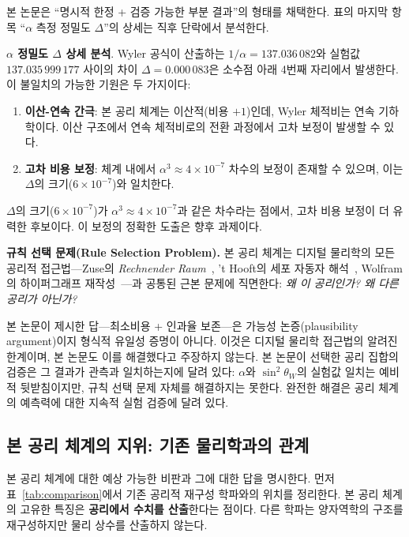 \documentclass[entropy,article,submit,pdftex,oneauthor]{Definitions/mdpi}
\begin{document}
본 논문은 ``명시적 한정 + 검증 가능한 부분 결과''의 형태를 채택한다. 표의 마지막 항목 ``$\alpha$ 측정 정밀도 $\Delta$''의 상세는 직후 단락에서 분석한다.

\textbf{$\alpha$ 정밀도 $\Delta$ 상세 분석}. Wyler 공식이 산출하는 $1/\alpha = 137.036\,082$와 실험값 $137.035\,999\,177$ 사이의 차이 $\Delta = 0.000\,083$은 소수점 아래 4번째 자리에서 발생한다. 이 불일치의 가능한 기원은 두 가지이다:
\begin{enumerate}
\item \textbf{이산-연속 간극}: 본 공리 체계는 이산적(비용 $+1$)인데, Wyler 체적비는 연속 기하학이다. 이산 구조에서 연속 체적비로의 전환 과정에서 고차 보정이 발생할 수 있다.
\item \textbf{고차 비용 보정}: 체계 내에서 $\alpha^3 \approx 4 \times 10^{-7}$ 차수의 보정이 존재할 수 있으며, 이는 $\Delta$의 크기($6 \times 10^{-7}$)와 일치한다.
\end{enumerate}
$\Delta$의 크기($6 \times 10^{-7}$)가 $\alpha^3 \approx 4 \times 10^{-7}$과 같은 차수라는 점에서, 고차 비용 보정이 더 유력한 후보이다. 이 보정의 정확한 도출은 향후 과제이다.

\textbf{규칙 선택 문제(Rule Selection Problem).} 본 공리 체계는 디지털 물리학의 모든 공리적 접근법---Zuse의 \textit{Rechnender Raum}~\cite{zuse1969}, 't Hooft의 세포 자동자 해석~\cite{thooft2016}, Wolfram의 하이퍼그래프 재작성~\cite{wolfram2002}---과 공통된 근본 문제에 직면한다: \emph{왜 이 공리인가? 왜 다른 공리가 아닌가?}

본 논문이 제시한 답---최소비용 + 인과율 보존---은 가능성 논증(plausibility argument)이지 형식적 유일성 증명이 아니다. 이것은 디지털 물리학 접근법의 알려진 한계이며, 본 논문도 이를 해결했다고 주장하지 않는다. 본 논문이 선택한 공리 집합의 검증은 그 결과가 관측과 일치하는지에 달려 있다: $\alpha$와 $\sin^2\theta_W$의 실험값 일치는 예비적 뒷받침이지만, 규칙 선택 문제 자체를 해결하지는 못한다. 완전한 해결은 공리 체계의 예측력에 대한 지속적 실험 검증에 달려 있다.

\subsection{본 공리 체계의 지위: 기존 물리학과의 관계}

본 공리 체계에 대한 예상 가능한 비판과 그에 대한 답을 명시한다. 먼저 표~\ref{tab:comparison}에서 기존 공리적 재구성 학파와의 위치를 정리한다. 본 공리 체계의 고유한 특징은 \textbf{공리에서 수치를 산출}한다는 점이다. 다른 학파는 양자역학의 구조를 재구성하지만 물리 상수를 산출하지 않는다.
\end{document}
